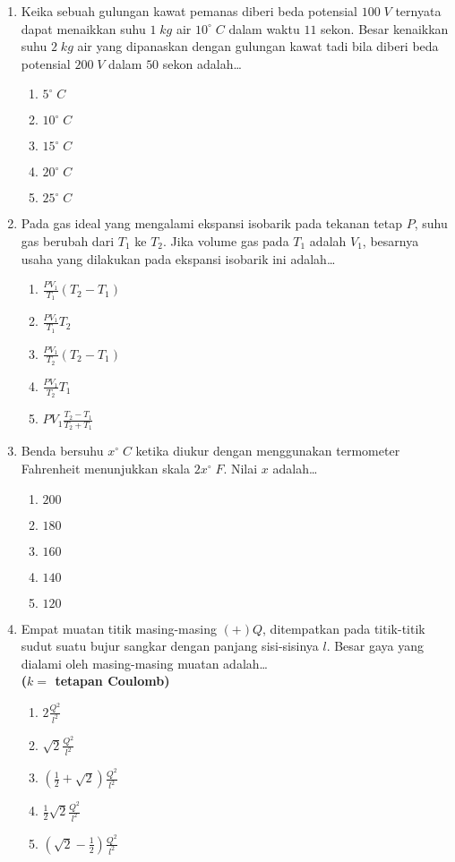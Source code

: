 \documentclass[A4,12PT, english, twocolumn]{journal}
\begin{document}
\begin{enumerate}
\item Keika sebuah gulungan kawat pemanas diberi beda potensial $100 \; V$ ternyata dapat menaikkan suhu $1 \; kg$ air $10^\circ \; C$ dalam waktu $11$ sekon. Besar kenaikkan suhu $2 \; kg$ air yang dipanaskan dengan gulungan kawat tadi bila diberi beda potensial $200 \; V$ dalam $50$ sekon adalah\dots
    \begin{enumerate}
        \item $5^\circ \; C$
        \item $10^\circ \; C$
        \item $15^\circ \; C$
        \item $20^\circ \; C$
        \item $25^\circ \; C$
    \end{enumerate}
    
\item Pada gas ideal yang mengalami ekspansi isobarik pada tekanan tetap $P$, suhu gas berubah dari $T_1$ ke $T_2$. Jika volume gas pada $T_1$ adalah $V_1$, besarnya usaha yang dilakukan pada ekspansi isobarik ini adalah\dots
    \begin{enumerate}
        \item $\frac{PV_1}{T_1}\left( T_2 - T_1 \right)$
        \item $\frac{PV_1}{T_1}T_2$
        \item $\frac{PV_1}{T_2}\left( T_2 - T_1 \right)$
        \item $\frac{PV_1}{T_2}T_1$
        \item $PV_1\frac{T_2-T_1}{T_2+T_1}$
    \end{enumerate}

\item Benda bersuhu $x^\circ \; C$ ketika diukur dengan menggunakan termometer Fahrenheit menunjukkan skala $2x^\circ \; F$. Nilai $x$ adalah\dots
    \begin{enumerate}
        \item $200$
        \item $180$
        \item $160$
        \item $140$
        \item $120$
    \end{enumerate}
    
\item Empat muatan titik masing-masing $\left(+ \right)Q$, ditempatkan pada titik-titik sudut suatu bujur sangkar dengan panjang sisi-sisinya $l$. Besar gaya yang dialami oleh masing-masing muatan adalah\dots \\
\textbf{($k=$ tetapan Coulomb)}
	\begin{enumerate}
		\item $2 \frac{Q^2}{l^2}$
		\item $\sqrt{2} \frac{Q^2}{l^2}$
		\item $\left( \frac{1}{2} + \sqrt{2} \right) \frac{Q^2}{l^2}$
		\item $\frac{1}{2}\sqrt{2} \frac{Q^2}{l^2}$
		\item $\left( \sqrt{2} - \frac{1}{2} \right) \frac{Q^2}{l^2}$
	\end{enumerate}


\end{enumerate}
\end{document}
